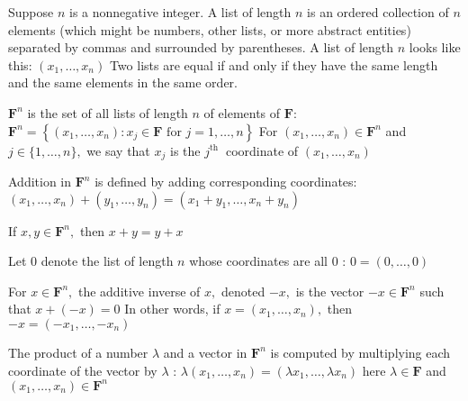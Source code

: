 Suppose $n$ is a nonnegative integer. A list of length $n$ is an ordered collection of $n$ elements (which might be numbers, other lists, or more abstract entities) separated by commas and surrounded by parentheses. A list of length $n$ looks like this:
$
\left(x_{1}, \ldots, x_{n}\right)
$
Two lists are equal if and only if they have the same length and the same elements in the same order.

$\mathbf{F}^{n}$ is the set of all lists of length $n$ of elements of $\mathbf{F}:$
$
\mathbf{F}^{n}=\left\{\left(x_{1}, \ldots, x_{n}\right): x_{j} \in \mathbf{F} \text { for } j=1, \ldots, n\right\}
$
For $\left(x_{1}, \ldots, x_{n}\right) \in \mathbf{F}^{n}$ and $j \in\{1, \ldots, n\},$ we say that $x_{j}$ is the $j^{\text {th }}$ coordinate of $\left(x_{1}, \dots, x_{n}\right)$

Addition in $\mathbf{F}^{n}$ is defined by adding corresponding coordinates:
$
\left(x_{1}, \ldots, x_{n}\right)+\left(y_{1}, \ldots, y_{n}\right)=\left(x_{1}+y_{1}, \ldots, x_{n}+y_{n}\right)
$

If $x, y \in \mathbf{F}^{n},$ then $x+y=y+x$

Let 0 denote the list of length $n$ whose coordinates are all 0 :
$
0=(0, \ldots, 0)
$

For $x \in \mathbf{F}^{n},$ the additive inverse of $x,$ denoted $-x,$ is the vector $-x \in \mathbf{F}^{n}$ such that $x+(-x)=0$
In other words, if $x=\left(x_{1}, \ldots, x_{n}\right),$ then $-x=\left(-x_{1}, \ldots,-x_{n}\right)$

The product of a number $\lambda$ and a vector in $\mathbf{F}^{n}$ is computed by multiplying each coordinate of the vector by $\lambda$ :
$
\lambda\left(x_{1}, \ldots, x_{n}\right)=\left(\lambda x_{1}, \ldots, \lambda x_{n}\right)
$
here $\lambda \in \mathbf{F}$ and $\left(x_{1}, \ldots, x_{n}\right) \in \mathbf{F}^{n}$